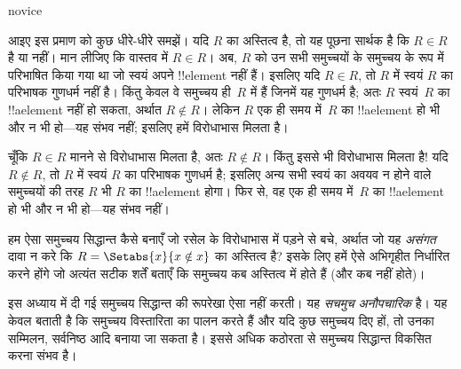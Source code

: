 \documentclass[../../../include/open-logic-section]{subfiles}
\begin{document}
\begin{tagblock}{novice}
\begin{explain}
आइए इस प्रमाण को कुछ धीरे-धीरे समझें। यदि $R$ का अस्तित्व है, तो यह
पूछना सार्थक है कि $R \in
R$ है या नहीं। मान लीजिए कि वास्तव में
$R \in R$। अब, $R$ को उन सभी समुच्चयों के समुच्चय के रूप में
परिभाषित किया गया था जो स्वयं अपने !!{element} नहीं हैं। इसलिए यदि
$R \in R$, तो $R$ में स्वयं $R$ का परिभाषक गुणधर्म नहीं है। किंतु
केवल वे समुच्चय ही~$R$ में हैं जिनमें यह गुणधर्म है; अतः $R$ स्वयं~$R$
का !!a{element} नहीं हो सकता, अर्थात $R \notin R$। लेकिन $R$ एक ही
समय में~$R$ का !!a{element} हो भी और न भी हो---यह संभव नहीं;
इसलिए हमें विरोधाभास मिलता है।

चूँकि $R \in R$ मानने से विरोधाभास मिलता है, अतः $R \notin R$। किंतु
इससे भी विरोधाभास मिलता है!{} यदि $R
\notin R$, तो $R$ में स्वयं
$R$ का परिभाषक गुणधर्म है; इसलिए अन्य सभी स्वयं का अवयव न होने वाले
समुच्चयों की तरह $R$ भी $R$ का !!a{element} होगा। फिर से, वह एक ही
समय में~$R$ का !!a{element} हो भी और न भी हो---यह संभव नहीं।
\end{explain}
\end{tagblock}

\begin{digress}
हम ऐसा समुच्चय सिद्धान्त कैसे बनाएँ जो रसेल के विरोधाभास में पड़ने से
बचे, अर्थात जो यह \emph{असंगत} दावा न करे कि
$R = \Setabs{x}{x \notin x}$ का अस्तित्व है? इसके लिए हमें ऐसे
अभिगृहीत निर्धारित करने होंगे जो अत्यंत सटीक शर्तें बताएँ कि समुच्चय कब
अस्तित्व में होते हैं (और कब नहीं होते)।
	
इस अध्याय में दी गई समुच्चय सिद्धान्त की रूपरेखा ऐसा नहीं करती। यह
\emph{सचमुच अनौपचारिक} है। यह केवल बताती है कि समुच्चय विस्तारिता का
पालन करते हैं और यदि कुछ समुच्चय दिए हों, तो उनका सम्मिलन, सर्वनिष्ठ
आदि बनाया जा सकता है। इससे अधिक कठोरता से समुच्चय सिद्धान्त विकसित करना
संभव है। 
\end{digress}
\end{document}
